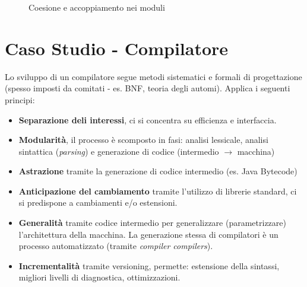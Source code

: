\begin{figure}[H]
  \centering
  \hfill
  \caption{Coesione e accoppiamento nei moduli}
\end{figure}

\section{Caso Studio - Compilatore}

Lo sviluppo di un compilatore segue metodi sistematici e formali di progettazione (spesso imposti da comitati - es. BNF, teoria degli automi). Applica i seguenti principi:
\begin{itemize}
    \item \textbf{Separazione deli interessi}, ci si concentra su efficienza e interfaccia.
    \item \textbf{Modularità}, il processo è scomposto in fasi: analisi lessicale, analisi sintattica (\textit{parsing}) e generazione di codice (intermedio $\rightarrow$ macchina)
    \item \textbf{Astrazione} tramite la generazione di codice intermedio (es. Java Bytecode)
    \item \textbf{Anticipazione del cambiamento} tramite l'utilizzo di librerie standard, ci si predispone a cambiamenti e/o estensioni.
    \item \textbf{Generalità} tramite codice intermedio per generalizzare (parametrizzare) l'architettura della macchina. La generazione stessa di compilatori è un processo automatizzato (tramite \textit{compiler compilers}).
    \item \textbf{Incrementalità} tramite versioning, permette: estensione della sintassi, migliori livelli di diagnostica, ottimizzazioni.
\end{itemize}

